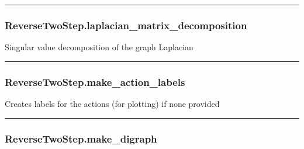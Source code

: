 \begin{center}\rule{0.5\linewidth}{\linethickness}\end{center}

\subsubsection{ReverseTwoStep.laplacian\_matrix\_decomposition}\label{reversetwostep.laplacian_matrix_decomposition}

\begin{Shaded}
\begin{Highlighting}[]
\NormalTok{)}
\end{Highlighting}
\end{Shaded}

Singular value decomposition of the graph Laplacian

\begin{center}\rule{0.5\linewidth}{\linethickness}\end{center}

\subsubsection{ReverseTwoStep.make\_action\_labels}\label{reversetwostep.make_action_labels}

\begin{Shaded}
\begin{Highlighting}[]
\NormalTok{)}
\end{Highlighting}
\end{Shaded}

Creates labels for the actions (for plotting) if none provided

\begin{center}\rule{0.5\linewidth}{\linethickness}\end{center}

\subsubsection{ReverseTwoStep.make\_digraph}\label{reversetwostep.make_digraph}

\begin{Shaded}
\begin{Highlighting}[]
\NormalTok{)}
\end{Highlighting}
\end{Shaded}


